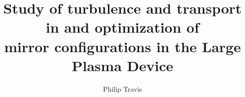 
\title{Study of turbulence and transport in and optimization of \\mirror configurations in the Large Plasma Device}

\author         {Philip Travis}




